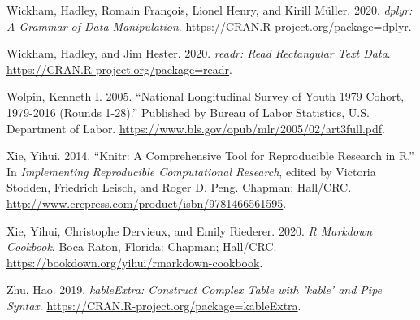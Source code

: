 \documentclass{article}
\begin{document}
\leavevmode\hypertarget{ref-dplyr}{}%
Wickham, Hadley, Romain François, Lionel Henry, and Kirill Müller. 2020. \emph{dplyr: A Grammar of Data Manipulation}. \url{https://CRAN.R-project.org/package=dplyr}.

\leavevmode\hypertarget{ref-readr}{}%
Wickham, Hadley, and Jim Hester. 2020. \emph{readr: Read Rectangular Text Data}. \url{https://CRAN.R-project.org/package=readr}.

\leavevmode\hypertarget{ref-nlsy79edu}{}%
Wolpin, Kenneth I. 2005. ``National Longitudinal Survey of Youth 1979 Cohort, 1979-2016 (Rounds 1-28).'' Published by Bureau of Labor Statistics, U.S. Department of Labor. \url{https://www.bls.gov/opub/mlr/2005/02/art3full.pdf}.

\leavevmode\hypertarget{ref-knitr}{}%
Xie, Yihui. 2014. ``Knitr: A Comprehensive Tool for Reproducible Research in R.'' In \emph{Implementing Reproducible Computational Research}, edited by Victoria Stodden, Friedrich Leisch, and Roger D. Peng. Chapman; Hall/CRC. \url{http://www.crcpress.com/product/isbn/9781466561595}.

\leavevmode\hypertarget{ref-rmarkdown}{}%
Xie, Yihui, Christophe Dervieux, and Emily Riederer. 2020. \emph{R Markdown Cookbook}. Boca Raton, Florida: Chapman; Hall/CRC. \url{https://bookdown.org/yihui/rmarkdown-cookbook}.

\leavevmode\hypertarget{ref-kableExtra}{}%
Zhu, Hao. 2019. \emph{kableExtra: Construct Complex Table with 'kable' and Pipe Syntax}. \url{https://CRAN.R-project.org/package=kableExtra}.



\end{document}
